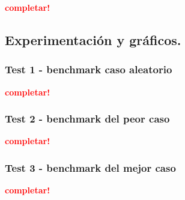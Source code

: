 \textcolor{red}{\textbf{completar!}}



\newpage
\subsection{Experimentación y gráficos.}

\vspace*{0.3cm}

\subsubsection{Test 1 - benchmark caso aleatorio}

\textcolor{red}{\textbf{completar!}}


\newpage
\subsubsection{Test 2 - benchmark del peor caso}

\textcolor{red}{\textbf{completar!}}


\newpage
\subsubsection{Test 3 - benchmark del mejor caso}

\textcolor{red}{\textbf{completar!}}
